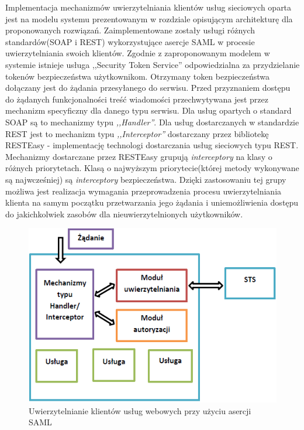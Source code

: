 	Implementacja mechanizmów uwierzytelniania klientów usług sieciowych oparta jest na modelu systemu prezentowanym w rozdziale opisującym architekturę dla proponowanych rozwiązań. Zaimplementowane zostały usługi różnych standardów(SOAP i REST) wykorzystujące asercje SAML w procesie uwierzytelniania swoich klientów. Zgodnie z zaproponowanym modelem w systemie istnieje usługa ,,Security Token Service'' odpowiedzialna za przydzielanie tokenów bezpieczeństwa użytkownikom. Otrzymany token bezpieczeństwa dołączany jest do żądania przesyłanego do serwisu. Przed przyznaniem dostępu do żądanych funkcjonalności treść wiadomości przechwytywana jest przez mechanizm specyficzny dla danego typu serwisu. Dla usług opartych o standard SOAP są to mechanizmy typu \textit{,,Handler''}. Dla usług dostarczanych w standardzie REST jest to mechanizm typu \textit{,,Interceptor''} dostarczany przez bibliotekę RESTEasy - implementację technologi dostarczania usług sieciowych typu REST. Mechanizmy dostarczane przez RESTEasy grupują \textit{interceptory} na klasy o różnych priorytetach. Klasą o najwyższym priorytecie(której metody wykonywane są najwcześniej) są \textit{interceptory} bezpieczeństwa. Dzięki zastosowaniu tej grupy możliwa jest realizacja wymagania przeprowadzenia procesu uwierzytelniania klienta na samym początku przetwarzania jego żądania i uniemożliwienia dostępu do jakichkolwiek zasobów dla nieuwierzytelnionych użytkowników.

	\begin{figure}[!htb]
		\centering
		\includegraphics{img/interceptorGatewayImplementation.png}
		\caption{Uwierzytelnianie klientów usług webowych przy użyciu asercji SAML}
		\label{interceptorGatewayImplementation}
	\end{figure}

